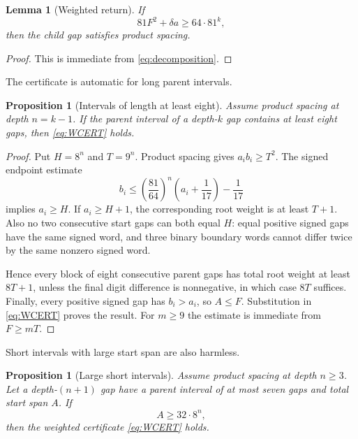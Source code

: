\documentclass[11pt,reqno]{amsart}
\numberwithin{equation}{section}
\newtheorem{proposition}[theorem]{Proposition}
\newtheorem{lemma}[theorem]{Lemma}
\theoremstyle{definition}
\theoremstyle{remark}
\begin{document}
\begin{lemma}[Weighted return]\label{lem:weighted}
If
\begin{equation}\label{eq:WCERT}
 81F^2+\delta a\ge64\cdot81^k,
\end{equation}
then the child gap satisfies product spacing.
\end{lemma}

\begin{proof}
This is immediate from \eqref{eq:decomposition}.
\end{proof}

The certificate is automatic for long parent intervals.

\begin{proposition}[Intervals of length at least eight]\label{prop:m8}
Assume product spacing at depth $n=k-1$.  If the parent interval of a depth-$k$ gap contains at least eight gaps, then \eqref{eq:WCERT} holds.
\end{proposition}

\begin{proof}
Put $H=8^n$ and $T=9^n$.  Product spacing gives $a_ib_i\ge T^2$.  The signed endpoint estimate
\[
 b_i\le\left(\frac{81}{64}\right)^n
 \left(a_i+\frac1{17}\right)-\frac1{17}
\]
implies $a_i\ge H$.  If $a_i\ge H+1$, the corresponding root weight is at least $T+1$.  Also no two consecutive start gaps can both equal $H$: equal positive signed gaps have the same signed word, and three binary boundary words cannot differ twice by the same nonzero signed word.

Hence every block of eight consecutive parent gaps has total root weight at least $8T+1$, unless the final digit difference is nonnegative, in which case $8T$ suffices.  Finally, every positive signed gap has $b_i>a_i$, so $A\le F$.  Substitution in \eqref{eq:WCERT} proves the result.  For $m\ge9$ the estimate is immediate from $F\ge mT$.
\end{proof}

Short intervals with large start span are also harmless.

\begin{proposition}[Large short intervals]\label{prop:largeshort}
Assume product spacing at depth $n\ge3$.  Let a depth-$(n+1)$ gap have a parent interval of at most seven gaps and total start span $A$.  If
\begin{equation}\label{eq:largespanhyp}
 A\ge32\cdot8^n,
\end{equation}
then the weighted certificate \eqref{eq:WCERT} holds.
\end{proposition}
\end{document}
